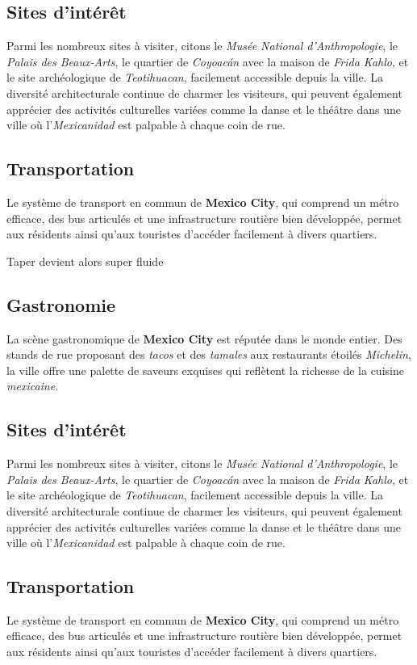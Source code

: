 \documentclass[12pt, a4paper]{article}
\begin{document}
\subsection*{\textbf{Sites d'intérêt}}

Parmi les nombreux sites à visiter, citons le \textit{Musée National d'Anthropologie}, le \textit{Palais des Beaux-Arts}, le quartier de \textit{Coyoacán} avec la maison de \textit{Frida Kahlo}, et le site archéologique de \textit{Teotihuacan}, facilement accessible depuis la ville.
La diversité architecturale continue de charmer les visiteurs, qui peuvent également apprécier des activités culturelles variées comme la danse et le théâtre dans une ville où l'\textit{Mexicanidad} est palpable à chaque coin de rue. \subsection*{\textbf{Transportation}} Le système de transport en commun de \textbf{Mexico City}, qui comprend un métro efficace, des bus articulés et une infrastructure routière bien développée, permet aux résidents ainsi qu'aux touristes d'accéder facilement à divers quartiers.

Taper devient alors super fluide


\subsection*{\textbf{Gastronomie}}

La scène gastronomique de \textbf{Mexico City} est réputée dans le monde entier. Des stands de rue proposant des \textit{tacos} et des \textit{tamales} aux restaurants étoilés \textit{Michelin}, la ville offre une palette de saveurs exquises qui reflètent la richesse de la cuisine \textit{mexicaine}.

\subsection*{\textbf{Sites d'intérêt}}

Parmi les nombreux sites à visiter, citons le \textit{Musée National d'Anthropologie}, le \textit{Palais des Beaux-Arts}, le quartier de \textit{Coyoacán} avec la maison de \textit{Frida Kahlo}, et le site archéologique de \textit{Teotihuacan}, facilement accessible depuis la ville.
La diversité architecturale continue de charmer les visiteurs, qui peuvent également apprécier des activités culturelles variées comme la danse et le théâtre dans une ville où l'\textit{Mexicanidad} est palpable à chaque coin de rue. \subsection*{\textbf{Transportation}} Le système de transport en commun de \textbf{Mexico City}, qui comprend un métro efficace, des bus articulés et une infrastructure routière bien développée, permet aux résidents ainsi qu'aux touristes d'accéder facilement à divers quartiers.
\end{document}
